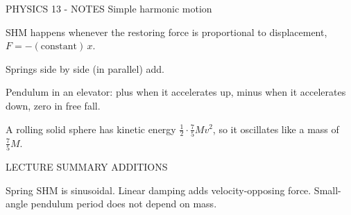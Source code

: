 PHYSICS 13 - NOTES
Simple harmonic motion

SHM happens whenever the restoring force is proportional to displacement, \(F = -(\text{constant})\,x\).

Springs side by side (in parallel) add.

Pendulum in an elevator: plus when it accelerates up, minus when it accelerates down, zero in free fall.

A rolling solid sphere has kinetic energy \(\tfrac12\cdot\tfrac75 Mv^2\), so it oscillates like a mass of \(\tfrac75 M\).

LECTURE SUMMARY ADDITIONS

Spring SHM is sinusoidal. Linear damping adds velocity-opposing force. Small-angle pendulum period does not depend on mass.
